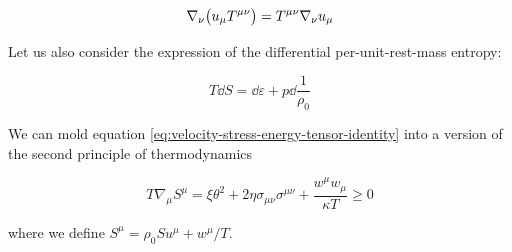 \documentclass[main.tex]{subfiles}
\begin{document}
\begin{equation} \label{eq:velocity-stress-energy-tensor-identity}
    \nabla_\nu \qty(u_\mu T ^{\mu \nu}) = T^{\mu \nu} \nabla_\nu u_\mu
\end{equation}

Let us also consider the expression of the differential per-unit-rest-mass entropy:

\begin{equation} \label{eq:differential-entropy}
    T\dd{S} = \dd{\varepsilon} + p \dd{\frac{1}{\rho_0}}
\end{equation}

\begin{claim}
    We can mold equation \eqref{eq:velocity-stress-energy-tensor-identity} into a version of the second principle of thermodynamics

    \begin{equation} \label{eq:second-principle-thermodynamics}
        T \nabla_\mu S^\mu = \xi \theta^2 + 2 \eta \sigma_{\mu\nu} \sigma^{\mu\nu} + \frac{w^\mu w_\mu}{\kappa T} \geq 0
    \end{equation}

    where we define \(S^\mu = \rho_0 S u^\mu + w^\mu /T\).
\end{claim}
\end{document}
